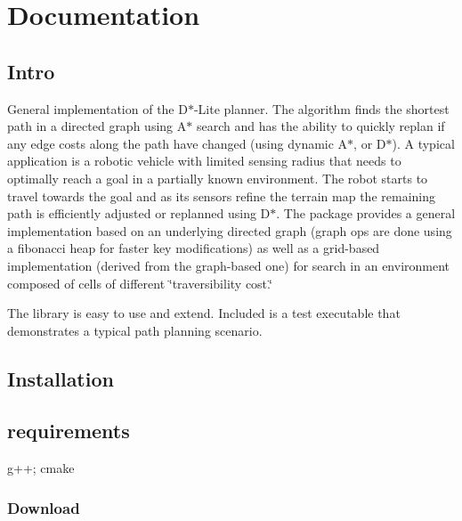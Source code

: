 \section{\-Documentation}\label{index_Documentation}
\subsection{\-Intro}\label{index_Intro}
\-General implementation of the \-D$\ast$-\/\-Lite planner. \-The algorithm finds the shortest path in a directed graph using \-A$\ast$ search and has the ability to quickly replan if any edge costs along the path have changed (using dynamic \-A$\ast$, or \-D$\ast$). \-A typical application is a robotic vehicle with limited sensing radius that needs to optimally reach a goal in a partially known environment. \-The robot starts to travel towards the goal and as its sensors refine the terrain map the remaining path is efficiently adjusted or replanned using \-D$\ast$. \-The package provides a general implementation based on an underlying directed graph (graph ops are done using a fibonacci heap for faster key modifications) as well as a grid-\/based implementation (derived from the graph-\/based one) for search in an environment composed of cells of different \char`\"{}traversibility cost.\char`\"{}

\-The library is easy to use and extend. \-Included is a test executable that demonstrates a typical path planning scenario.\subsection{\-Installation}\label{index_Installation}
\subsection{requirements}\label{index_Build}
g++; cmake\subsubsection{\-Download}\label{index_Download}

